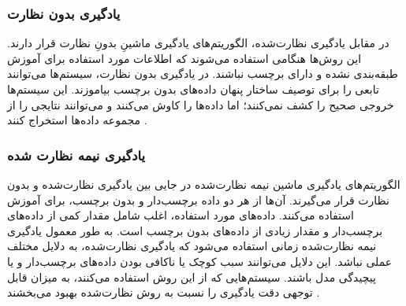 \subsubsection{یادگیری بدون نظارت}
در مقابل  یادگیری نظارت‌شده، الگوریتم‌های یادگیری ماشینِ بدونِ نظارت قرار دارند. این روش‌ها هنگامی‌ استفاده می‌شوند که اطلاعات مورد استفاده برای آموزش طبقه‌بندی نشده و دارای برچسب نباشند. در یادگیری بدون نظارت، سیستم‌ها می‌توانند تابعی را برای توصیف ساختار پنهان داده‌های بدون برچسب بیاموزند. این سیستم‌ها خروجی صحیح را کشف نمی‌کنند؛ اما داده‌ها را کاوش می‌کنند و می‌توانند نتایجی را از مجموعه داده‌ها استخراج کنند
\cite{mldef}.


\subsubsection{یادگیری نیمه نظارت شده}

الگوریتم‌های یادگیری ماشین نیمه نظارت‌شده در جایی بین یادگیری نظارت‌شده و بدون نظارت قرار می‌گیرند. آن‌ها از هر دو داده برچسب‌دار و بدون برچسب، برای آموزش استفاده می‌کنند. داده‌های مورد استفاده، اغلب شامل مقدار کمی از داده‌های برچسب‌دار و مقدار زیادی از داده‌های بدون برچسب است. به طور معمول یادگیری نیمه نظارت‌شده زمانی استفاده می‌شود که یادگیری نظارت‌شده، به دلایل مختلف عملی نباشد. این دلایل می‌توانند سبب کوچک یا ناکافی بودن داده‌های برچسب‌دار و یا پیچیدگی مدل باشند. سیستم‌هایی که از این روش استفاده می‌کنند، به میزان قابل توجهی دقت یادگیری را نسبت به روش نظارت‌شده بهبود می‌بخشند
\cite{mldef}. 

